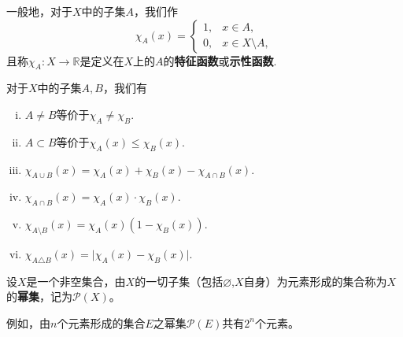 \documentclass[lang=cn,newtx,10pt,scheme=chinese]{../Template/elegantbook}
\begin{document}
\begin{definition}[示性函数]\label{definition:示性函数}
  一般地，对于\(X\)中的子集\(A\)，我们作
\[
\chi_A(x)=
\begin{cases}
1, & x\in A, \\
0, & x\in X\setminus A,
\end{cases}
\]
且称\(\chi_A:X\rightarrow\mathbb{R}\)是定义在\(X\)上的\(A\)的\textbf{特征函数}或\textbf{示性函数}.
\end{definition}

\begin{proposition}[示性函数的基本性质]\label{proposition:示性函数的基本性质}
  对于\(X\)中的子集\(A,B\)，我们有
\begin{enumerate}[(i)]
  \item \(A\neq B\)等价于\(\chi_A\neq\chi_B\).

  \item \(A\subset B\)等价于\(\chi_A(x)\leqslant\chi_B(x)\).

  \item \(\chi_{A\cup B}(x)=\chi_A(x)+\chi_B(x)-\chi_{A\cap B}(x)\).

  \item \(\chi_{A\cap B}(x)=\chi_A(x)\cdot\chi_B(x)\).

  \item \(\chi_{A\setminus B}(x)=\chi_A(x)(1 - \chi_B(x))\).
  
  \item \(\chi_{A\triangle B}(x)=\vert\chi_A(x)-\chi_B(x)\vert\).
\end{enumerate}
\end{proposition}

\begin{definition}[幂集]\label{definition:幂集}
  设\(X\)是一个非空集合，由\(X\)的一切子集（包括\(\varnothing\),\(X\)自身）为元素形成的集合称为\(X\)的\textbf{幂集}，记为\(\mathcal{P}(X)\)。
\end{definition}
\begin{note}
  例如，由\(n\)个元素形成的集合\(E\)之幂集\(\mathcal{P}(E)\)共有\(2^n\)个元素。
\end{note}
\end{document}
